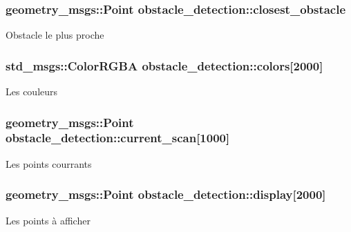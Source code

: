 \subsubsection[{\texorpdfstring{closest\+\_\+obstacle}{closest_obstacle}}]{\setlength{\rightskip}{0pt plus 5cm}geometry\+\_\+msgs\+::\+Point obstacle\+\_\+detection\+::closest\+\_\+obstacle\hspace{0.3cm}{\ttfamily [private]}}\hypertarget{classobstacle__detection_a3fe5485079455a3179b0f30c2d29ac59}{}\label{classobstacle__detection_a3fe5485079455a3179b0f30c2d29ac59}
Obstacle le plus proche 
\subsubsection[{\texorpdfstring{colors}{colors}}]{\setlength{\rightskip}{0pt plus 5cm}std\+\_\+msgs\+::\+Color\+R\+G\+BA obstacle\+\_\+detection\+::colors\mbox{[}2000\mbox{]}\hspace{0.3cm}{\ttfamily [private]}}\hypertarget{classobstacle__detection_a3ca3ada2b7bd7ea94c1ad2b53aa8b8f1}{}\label{classobstacle__detection_a3ca3ada2b7bd7ea94c1ad2b53aa8b8f1}
Les couleurs 
\subsubsection[{\texorpdfstring{current\+\_\+scan}{current_scan}}]{\setlength{\rightskip}{0pt plus 5cm}geometry\+\_\+msgs\+::\+Point obstacle\+\_\+detection\+::current\+\_\+scan\mbox{[}1000\mbox{]}\hspace{0.3cm}{\ttfamily [private]}}\hypertarget{classobstacle__detection_abe28e799771603cfd242cff3cc8360e1}{}\label{classobstacle__detection_abe28e799771603cfd242cff3cc8360e1}
Les points courrants 
\subsubsection[{\texorpdfstring{display}{display}}]{\setlength{\rightskip}{0pt plus 5cm}geometry\+\_\+msgs\+::\+Point obstacle\+\_\+detection\+::display\mbox{[}2000\mbox{]}\hspace{0.3cm}{\ttfamily [private]}}\hypertarget{classobstacle__detection_aa18bcd8cf14b32205e6716aec023e0f5}{}\label{classobstacle__detection_aa18bcd8cf14b32205e6716aec023e0f5}
Les points à afficher 
